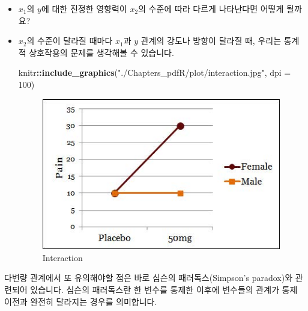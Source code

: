 \documentclass[]{book}
\newenvironment{Shaded}{\begin{snugshade}}{\end{snugshade}}
\newcommand{\DataTypeTok}[1]{\textcolor[rgb]{0.13,0.29,0.53}{#1}}
\newcommand{\DecValTok}[1]{\textcolor[rgb]{0.00,0.00,0.81}{#1}}
\newcommand{\KeywordTok}[1]{\textcolor[rgb]{0.13,0.29,0.53}{\textbf{#1}}}
\newcommand{\NormalTok}[1]{#1}
\newcommand{\OperatorTok}[1]{\textcolor[rgb]{0.81,0.36,0.00}{\textbf{#1}}}
\newcommand{\StringTok}[1]{\textcolor[rgb]{0.31,0.60,0.02}{#1}}
\begin{document}
\begin{itemize}
\item
  \(x_1\)의 \(y\)에 대한 진정한 영향력이 \(x_2\)의 수준에 따라 다르게 나타난다면 어떻게 될까요?
\item
  \(x_2\)의 수준이 달라질 때마다 \(x_1\)과 \(y\) 관계의 강도나 방향이 달라질 때, 우리는 통계적 상호작용의 문제를 생각해볼 수 있습니다.

\begin{Shaded}
\begin{Highlighting}[]
\NormalTok{knitr}\OperatorTok{::}\KeywordTok{include_graphics}\NormalTok{(}\StringTok{"./Chapters_pdfR/plot/interaction.jpg"}\NormalTok{, }\DataTypeTok{dpi =} \DecValTok{100}\NormalTok{)}
\end{Highlighting}
\end{Shaded}

  \begin{figure}

  {\centering \includegraphics[width=4.12in]{./Chapters_pdfR/plot/interaction} 

  }

  \caption{Interaction}\label{fig:unnamed-chunk-220}
  \end{figure}
\end{itemize}

다변량 관계에서 또 유의해야할 점은 바로 심슨의 패러독스(Simpson's paradox)와 관련되어 있습니다. 심슨의 패러독스란 한 변수를 통제한 이후에 변수들의 관계가 통제 이전과 완전히 달라지는 경우를 의미합니다.
\end{document}

